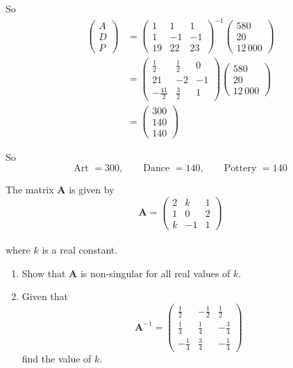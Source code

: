 \documentclass[leqno]{article}
\begin{document}
\begin{enumerate}[
  label=\textbf{\arabic*.},
  leftmargin=*,
  topsep=0pt,
  partopsep=0pt,
  parsep=0pt
]
\begin{djsSolution}
So
\begin{align*}
\begin{pmatrix}
    A \\ D \\ P
\end{pmatrix}
&=
\begin{pmatrix}
1&1&1\\
1&-1&-1\\
19&22&23
\end{pmatrix}^{-1}\begin{pmatrix}
580\\
20\\
12\,000
\end{pmatrix} \\
&= \begin{pmatrix}
\frac12&\frac12&0\\
21&-2&-1\\
-\frac{41}{2}&\frac32&1
\end{pmatrix}\begin{pmatrix}
580\\
20\\
12\,000
\end{pmatrix} \\
&= \begin{pmatrix}
300\\
140\\
140
\end{pmatrix}
\end{align*}

So
\[
\text{Art }=300,\qquad \text{Dance }=140,\qquad \text{Pottery }=140
\]
\end{djsSolution}


\newpage

\questionitem

The matrix $\mathbf{A}$ is given by
\[
\mathbf{A}=\begin{pmatrix}
2 & k & 1\\
1 & 0 & 2\\
k & -1 & 1
\end{pmatrix}
\] \\
where $k$ is a real constant. \\

\begin{enumerate}[label=\textbf{(\alph*)}]
  \item Show that $\mathbf{A}$ is non-singular for all real values of $k$.  \\
  \item Given that
  \[
\renewcommand{\arraystretch}{1.5}
\mathbf{A}^{-1}=\begin{pmatrix}
  \tfrac{1}{2} & -\frac{1}{2} & \frac{1}{2}\\
  \frac{1}{4} & \frac{1}{4} & -\frac{3}{4}\\
  -\frac{1}{4} & \frac{3}{4} & -\frac{1}{4}
\end{pmatrix}
  \]
  find the value of $k$.  \\
\end{enumerate}


\end{enumerate}
\end{document}
